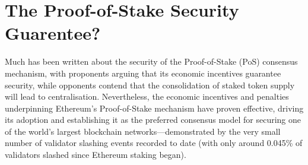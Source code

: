 \documentclass[11pt,a4paper]{article}
\begin{document}
\section{The Proof-of-Stake Security Guarentee?}
\label{sec:background}
Much has been written about the security of the Proof-of-Stake (PoS) consensus mechanism, with proponents arguing that its economic incentives guarantee security, while opponents contend that the consolidation of staked token supply will lead to centralisation.
Nevertheless, the economic incentives and penalties underpinning Ethereum’s Proof-of-Stake mechanism have proven effective, driving its adoption and establishing it as the preferred consensus model for securing one of the world’s largest blockchain networks—demonstrated by the very small number of validator slashing events recorded to date (with only around 0.045\% of validators slashed since Ethereum staking began).
\end{document}

